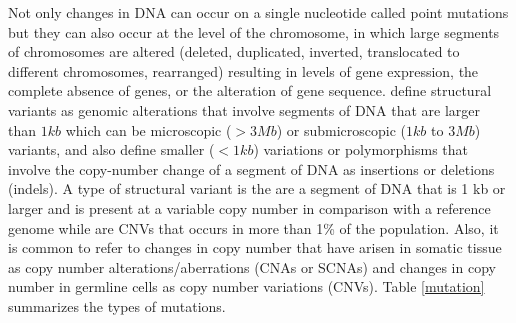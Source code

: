 Not only changes in DNA can occur on a single nucleotide called point mutations but they can
also occur at the level of the chromosome, in which large segments of chromosomes are altered
(deleted, duplicated, inverted, translocated to different chromosomes, rearranged)
resulting in levels of gene expression, the complete absence of genes, or the alteration of gene sequence.
 define structural variants as genomic alterations that involve segments
of DNA that are larger than $1 kb$ which can be microscopic ($> 3Mb$) or submicroscopic ($1 kb$ to $3 Mb$) variants,
and also define smaller ($<1 kb$) variations or polymorphisms that involve the copy-number change
 of a segment of DNA as insertions or deletions (indels).
A type of structural variant is the  are a segment of DNA that is 1 kb or larger and is present at a variable copy number in comparison with a reference genome while  are CNVs that occurs in more than 1\% of the population. Also, it is common to refer to changes in copy number that have arisen in somatic tissue as copy number alterations/aberrations (CNAs or SCNAs) and changes in copy number in germline cells
 as copy number variations (CNVs).
Table \ref{mutation} summarizes the types of mutations.




